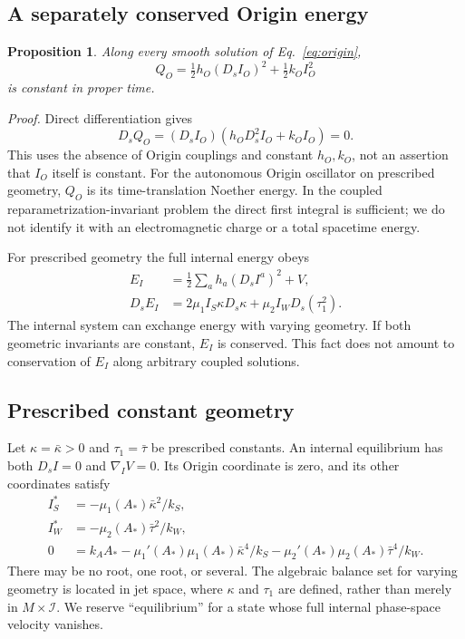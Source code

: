 \documentclass[aip,jmp,reprint,onecolumn,amsmath,amssymb]{revtex4-2}
\newcommand{\Ds}{D_s}
\newcommand{\I}{\mathcal I}
\newtheorem{proposition}{Proposition}
\begin{document}
\subsection{A separately conserved Origin energy}
\begin{proposition}
Along every smooth solution of Eq.~\eqref{eq:origin},
\begin{equation}
 Q_O=\tfrac12 h_O(\Ds I_O)^2+\tfrac12 k_O I_O^2
 \label{eq:Q}
\end{equation}
is constant in proper time.
\end{proposition}
\textit{Proof.} Direct differentiation gives
\begin{equation}
 \Ds Q_O=(\Ds I_O)(h_O\Ds^2 I_O+k_O I_O)=0.
\end{equation}
This uses the absence of Origin couplings and constant $h_O,k_O$, not an assertion that $I_O$ itself is constant. For the autonomous Origin oscillator on prescribed geometry, $Q_O$ is its time-translation Noether energy.\cite{noether} In the coupled reparametrization-invariant problem the direct first integral is sufficient; we do not identify it with an electromagnetic charge or a total spacetime energy.

For prescribed geometry the full internal energy obeys
\begin{align}
 E_I&=\tfrac12\sum_a h_a(\Ds I^a)^2+V,\\
 \Ds E_I&=2\mu_1 I_S\kappa\Ds\kappa
             +\mu_2 I_W\Ds(\tau_1^2).
 \label{eq:energy}
\end{align}
The internal system can exchange energy with varying geometry. If both geometric invariants are constant, $E_I$ is conserved. This fact does not amount to conservation of $E_I$ along arbitrary coupled solutions.

\subsection{Prescribed constant geometry}
Let $\kappa=\bar\kappa>0$ and $\tau_1=\bar\tau$ be prescribed constants. An internal equilibrium has both $\Ds I=0$ and $\nabla_I V=0$. Its Origin coordinate is zero, and its other coordinates satisfy
\begin{align}
 I_S^*&=-\mu_1(A_*)\bar\kappa^2/k_S,\label{eq:IstarS}\\
 I_W^*&=-\mu_2(A_*)\bar\tau^2/k_W,\label{eq:IstarW}\\
 0&=k_A A_*-
 \mu_1'(A_*)\mu_1(A_*)\bar\kappa^4/k_S
 -\mu_2'(A_*)\mu_2(A_*)\bar\tau^4/k_W.\label{eq:Astar}
\end{align}
There may be no root, one root, or several. The algebraic balance set for varying geometry is located in jet space, where $\kappa$ and $\tau_1$ are defined, rather than merely in $M\times\I$. We reserve ``equilibrium'' for a state whose full internal phase-space velocity vanishes.
\end{document}
